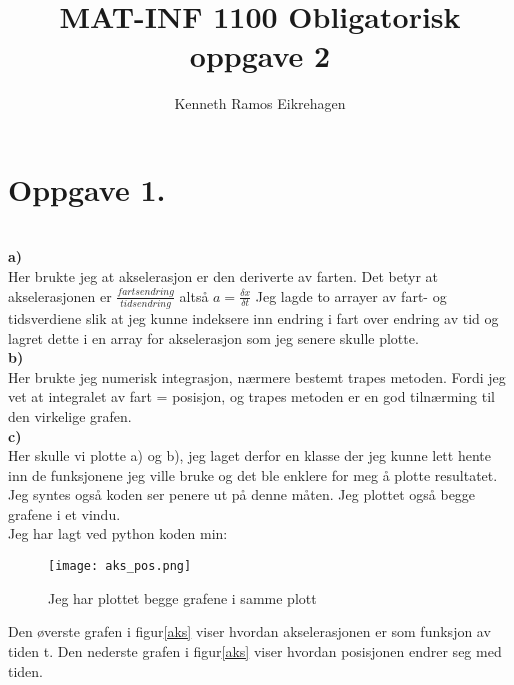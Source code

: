 \documentclass[,norsk]{article}
\title{MAT-INF 1100 Obligatorisk oppgave 2}
\author{Kenneth Ramos Eikrehagen}
\begin{document}
\maketitle
\tableofcontents

\section{Oppgave 1.}
\\
\textbf{a)}\\
Her brukte jeg at akselerasjon er den deriverte av farten. Det betyr at akselerasjonen er $\frac{fartsendring}{tids endring}$ altså $a = \frac{\delta x}{\delta t}$ Jeg lagde to arrayer av fart- og tidsverdiene slik at jeg kunne indeksere inn endring i fart over endring av tid og lagret dette i en array for akselerasjon som jeg senere skulle plotte. \\
\textbf{b)}\\
Her brukte jeg numerisk integrasjon, nærmere bestemt trapes metoden. Fordi jeg vet at integralet av fart = posisjon, og trapes metoden er en god tilnærming til den virkelige grafen. \\
\textbf{c)}\\
Her skulle vi plotte a) og b), jeg laget derfor en klasse der jeg kunne lett hente inn de funksjonene jeg ville bruke og det ble enklere for meg å plotte resultatet. Jeg syntes også koden ser penere ut på denne måten. Jeg plottet også begge grafene i et vindu. \\
Jeg har lagt ved python koden min:

\begin{figure}
\texttt{[image: aks\_pos.png]}
\caption{Jeg har plottet begge grafene i samme plott \label{aks}}
\end{figure}
Den øverste grafen i figur\vref{aks} viser hvordan akselerasjonen er som funksjon av tiden t. Den nederste grafen i figur\vref{aks} viser hvordan posisjonen endrer seg med tiden.
\\
\end{document}
